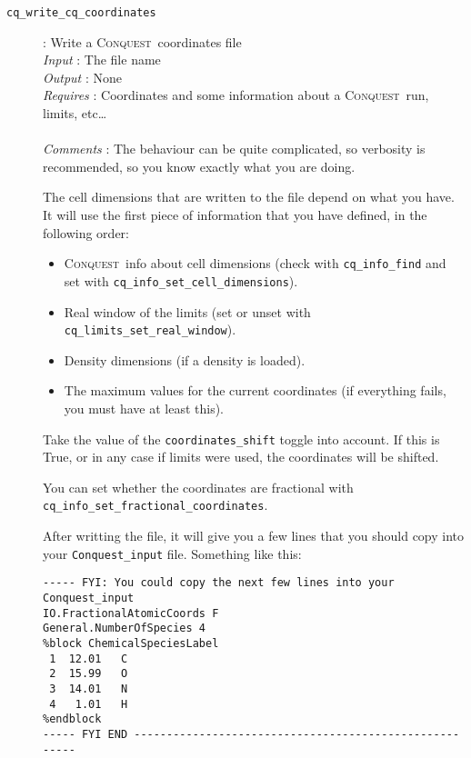 \documentclass[a4paper,notitlepage,11pt]{article}
\def\CQ{\textsc{Conquest}}
\begin{document}
\begin{description}
\item[\texttt{cq\_write\_cq\_coordinates}]: Write a \CQ\ coordinates
file\\ 
\emph{Input} : The file name\\ 
\emph{Output} : None\\
  \emph{Requires} : Coordinates and some information about a \CQ\ run, limits,
  etc\ldots\\
  \\
  \emph{Comments} : The behaviour can be quite complicated, so verbosity is
  recommended, so you know exactly what you are doing. 
  
  The cell  dimensions that are written to the file depend on what you have. 
  It will use the first piece of information that you have defined, in the following order:
\begin{itemize}
  \item \CQ\ info about cell dimensions (check with
  \texttt{cq\_info\_find} and set with \linebreak
  \texttt{cq\_info\_set\_cell\_dimensions}).
  \item Real window of the limits (set or unset with
  \texttt{cq\_limits\_set\_real\_window}).
  \item Density dimensions (if a density is loaded).
  \item The maximum values for the current coordinates (if everything fails,
  you must have at least this).
\end{itemize}
Take the value of the \texttt{coordinates\_shift} toggle into account. If this
is True, or in any case if limits were used, the coordinates will be shifted.

You can set whether the coordinates are fractional with
\texttt{cq\_info\_set\_fractional\_coordinates}.

After writting the file, it will give you a few lines that you should copy into
your \texttt{Conquest\_input} file. Something like this:

\begin{verbatim}
----- FYI: You could copy the next few lines into your Conquest_input
IO.FractionalAtomicCoords F
General.NumberOfSpecies 4
%block ChemicalSpeciesLabel
 1  12.01   C
 2  15.99   O
 3  14.01   N
 4   1.01   H
%endblock
----- FYI END -------------------------------------------------------
\end{verbatim}

\end{description}
\end{document}
